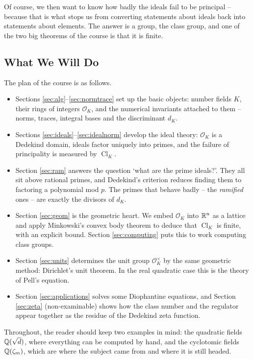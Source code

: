 \documentclass[a4paper]{scrartcl}
\renewcommand{\OO}{\mathcal{O}}
\newcommand{\Cl}{\operatorname{Cl}}
\begin{document}
Of course, we then want to know how badly the ideals fail to be principal -- because that is what stops us from converting statements about ideals back into statements about elements. The answer is a group, the class group, and one of the two big theorems of the course is that it is finite.

\subsection{What We Will Do}

The plan of the course is as follows.
\begin{itemize}
	\item Sections \ref{sec:alg}--\ref{sec:normtrace} set up the basic objects: number fields $K$, their rings of integers $\OO_K$, and the numerical invariants attached to them -- norms, traces, integral bases and the discriminant $d_K$.
	\item Sections \ref{sec:ideals}--\ref{sec:idealnorm} develop the ideal theory: $\OO_K$ is a Dedekind domain, ideals factor uniquely into primes, and the failure of principality is measured by $\Cl_K$.
	\item Section \ref{sec:ram} answers the question `what are the prime ideals?'. They all sit above rational primes, and Dedekind's criterion reduces finding them to factoring a polynomial mod $p$. The primes that behave badly -- the \emph{ramified} ones -- are exactly the divisors of $d_K$.
	\item Section \ref{sec:geom} is the geometric heart. We embed $\OO_K$ into $\mathbb{R}^n$ as a lattice and apply Minkowski's convex body theorem to deduce that $\Cl_K$ is finite, with an explicit bound. Section \ref{sec:computing} puts this to work computing class groups.
	\item Section \ref{sec:units} determines the unit group $\OO_K^\times$ by the same geometric method: Dirichlet's unit theorem. In the real quadratic case this is the theory of Pell's equation.
	\item Section \ref{sec:applications} solves some Diophantine equations, and Section \ref{sec:zeta} (non-examinable) shows how the class number and the regulator appear together as the residue of the Dedekind zeta function.
\end{itemize}

Throughout, the reader should keep two examples in mind: the quadratic fields $\mathbb{Q}(\sqrt d)$, where everything can be computed by hand, and the cyclotomic fields $\mathbb{Q}(\zeta_m)$, which are where the subject came from and where it is still headed.
\end{document}
